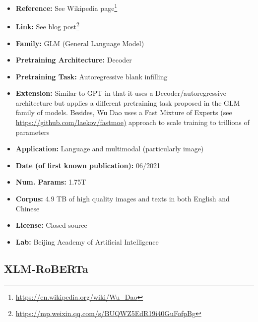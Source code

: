\documentclass{article}
\begin{document}
            \begin{itemize}
                \item \textbf{Reference:} See Wikipedia page\footnote{\url{https://en.wikipedia.org/wiki/Wu_Dao}}
                \item \textbf{Link:} See blog post\footnote{\url{https://mp.weixin.qq.com/s/BUQWZ5EdR19i40GuFofpBg}}
                \item \textbf{Family:} GLM (General Language Model)
                \item \textbf{Pretraining Architecture:} Decoder
                \item \textbf{Pretraining Task:} Autoregressive blank infilling
                \item \textbf{Extension:} Similar to GPT in that it uses a Decoder/autoregressive architecture but applies a different pretraining task proposed in the GLM family of models. Besides, Wu Dao uses a Fast Mixture of Experts (see \url{https://github.com/laekov/fastmoe)} approach to scale training to trillions of parameters
                \item \textbf{Application:} Language and multimodal (particularly image)
                \item \textbf{Date (of first known publication):} 06/2021
                \item \textbf{Num. Params:} 1.75T
                \item \textbf{Corpus:}  4.9 TB of high quality images and texts in both English and Chinese
                \item \textbf{License:} Closed source
                \item \textbf{Lab:} Beijing Academy of Artificial Intelligence
            \end{itemize}

\subsection{XLM-RoBERTa}
\end{document}
